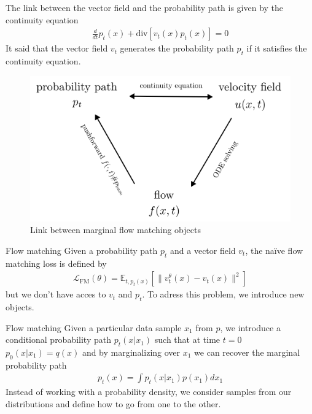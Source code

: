\documentclass{beamer}
\begin{document}
\begin{frame}
    The link between the vector field and the probability path is given by the continuity equation 
    \begin{align}
        \frac{d}{dt}p_t(x)+\text{div}\left[v_t(x)p_t(x)\right]=0
    \end{align}
    It said that the vector field \(v_t\) generates the probability path \(p_t\) if it satisfies the continuity equation.\\

    \begin{figure}[b]
        \centering
        \includegraphics[width=0.7\linewidth]{images/LinkBetweenObjects.png}
        \caption{Link between marginal flow matching objects}
        \label{fig:flow_matching}
    \end{figure}
\end{frame}

\begin{frame}{Flow matching}
    Given a probability path \(p_t\) and a vector field \(v_t\), the naïve flow matching loss is defined by
    \begin{align}
        \mathcal{L}_\text{FM}(\theta)=\mathbb{E}_{t,p_t(x)}\left[ \| v_t^\theta(x)-v_t(x)\|^2 \right]
    \end{align}
    but we don't have acces to \(v_t\) and \(p_t\).
    \bigskip
    To adress this problem, we introduce new objects. 
\end{frame}

\begin{frame}{Flow matching}
    Given a particular data sample \(x_1\) from \(p\), we introduce a conditional probability path \(p_t(x|x_1)\) such that at time \(t=0\) \(p_0(x|x_1)=q(x)\) and by marginalizing over \(x_1\) we can recover the marginal probability path 
    \begin{align}
        p_t(x)=\int p_t(x|x_1)p(x_1)dx_1
    \end{align}
    Instead of working with a probability density, we consider samples from our distributions and define how to go from one to the other.\\
\end{frame}
    
\end{document}
